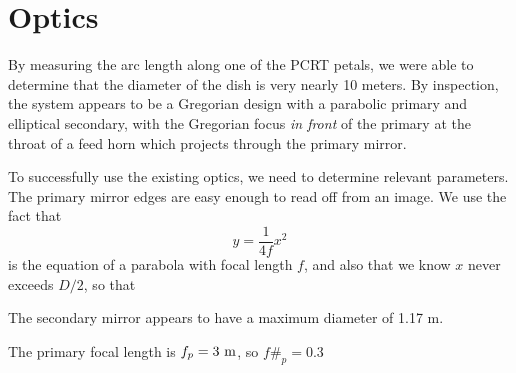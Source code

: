 \chapter{Optics}

By measuring the arc length along one of the PCRT petals, we were able to determine that the diameter of the dish is very nearly 10 meters.  By inspection, the system appears to be a Gregorian design with a parabolic primary and elliptical secondary, with the Gregorian focus {\it in front} of the primary at the throat of a feed horn which projects through the primary mirror. 

To successfully use the existing optics, we need to determine relevant parameters.  The primary mirror edges are easy enough to read off from an image.  We use the fact that
\begin{equation}
y = \frac{1}{4f} x^2
\end{equation}
is the equation of a parabola with focal length $f$, and also that we know $x$ never exceeds $D/2$, so that 


 The secondary mirror appears to have a maximum diameter of 1.17 m.  

The primary focal length is $f_p = 3~\rm{m}$, so $f\#_p = 0.3$